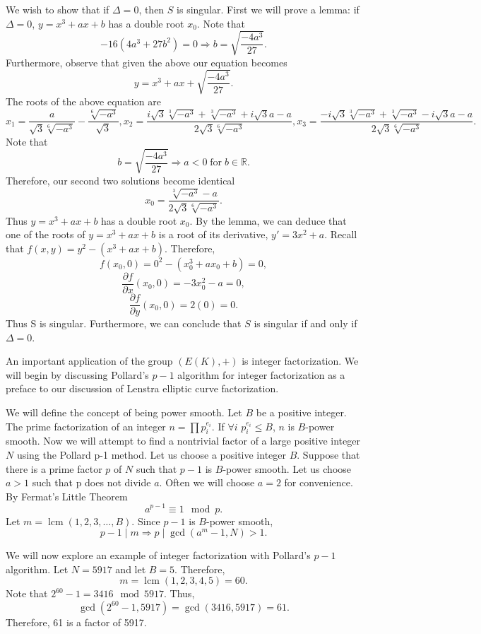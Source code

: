 \documentclass{article}
\DeclareMathOperator{\for}{for}
\DeclareMathOperator{\lcm}{lcm}
\begin{document}
\indent We wish to show that if $\Delta=0$, then $S$ is singular. First we will prove a lemma: if $\Delta=0$, $y=x^3+ax+b$ has a double root $x_0$. Note that
$$-16(4a^3+27b^2)=0 \Longrightarrow b = \sqrt{\frac{-4a^3}{27}}.$$
Furthermore, observe that given the above our equation becomes
$$y=x^3+ax+\sqrt{\frac{-4a^3}{27}}.$$
The roots of the above equation are
$$x_1=\frac{a}{\sqrt{3}\sqrt[6]{-a^3}}-\frac{\sqrt[6]{-a^3}}{\sqrt{3}}, x_2=\frac{i\sqrt{3}\sqrt[3]{-a^3}+\sqrt[3]{-a^3}+i\sqrt{3}a-a}{2\sqrt{3}\sqrt[6]{-a^3}}, x_3=\frac{-i\sqrt{3}\sqrt[3]{-a^3}+\sqrt[3]{-a^3}-i\sqrt{3}a-a}{2\sqrt{3}\sqrt[6]{-a^3}}.$$
Note that
$$b=\sqrt{\frac{-4a^3}{27}} \Longrightarrow a<0 \for b \in \mathbb{R}.$$
Therefore, our second two solutions become identical
$$x_0=\frac{\sqrt[3]{-a^3}-a}{2\sqrt{3}\sqrt[6]{-a^3}}.$$
Thus $y=x^3+ax+b$ has a double root $x_0$.
By the lemma, we can deduce that one of the roots of $y=x^3+ax+b$ is a root of its derivative, $y'=3x^2+a$. Recall that $f(x,y)=y^2-(x^3+ax+b)$. Therefore,
$$f(x_0,0)=0^2-(x_0^3+ax_0+b)=0,$$
$$\frac{\partial f}{\partial x} (x_0,0)=-3x_0^2-a=0,$$
$$\frac{\partial f}{\partial y} (x_0,0)=2(0)=0.$$
Thus S is singular. Furthermore, we can conclude that $S$ is singular if and only if $\Delta=0$. 

\indent An important application of the group $(E(K),+)$ is integer factorization. We will begin by discussing Pollard's $p-1$ algorithm for integer factorization as a preface to our discussion of Lenstra elliptic curve factorization.

\indent We will define the concept of being power smooth. Let $B$ be a positive integer. The prime factorization of an integer $n=\prod p_{i}^{e_{i}}$. If $\forall i$ $p_{i}^{e_{i}} \leq B$, $n$ is $B$-power smooth. Now we will attempt to find a nontrivial factor of a large positive integer $N$ using the Pollard p-1 method. Let us choose a positive integer $B$. Suppose that there is a prime factor $p$ of $N$ such that $p-1$ is $B$-power smooth. Let us choose $a > 1$ such that p does not divide $a$. Often we will choose $a=2$ for convenience. By Fermat's Little Theorem
$$a^{p-1} \equiv 1 \mod p.$$
Let $m = \lcm (1,2,3,\dotso,B)$. Since $p-1$ is $B$-power smooth, 
$$p-1 \mid m \Longrightarrow p \mid \gcd (a^m-1,N) > 1.$$

\indent We will now explore an example of integer factorization with Pollard's $p-1$ algorithm. Let $N=5917$ and let $B=5$. Therefore, 
$$m=\lcm (1,2,3,4,5)=60.$$
Note that $2^{60}-1=3416 \mod 5917$. Thus,
$$\gcd (2^{60}-1, 5917)=\gcd (3416, 5917)=61.$$
Therefore, 61 is a factor of 5917.
\end{document}
